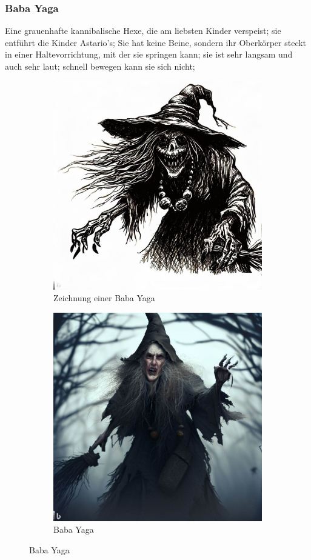 \documentclass[11pt, twoside]{article}
\begin{document}
\subsubsection{Baba Yaga\label{baba}}
\label{sec:orgacc5a1b}
Eine grauenhafte kannibalische Hexe, die am liebsten Kinder verspeist; sie entführt die Kinder Astario’s; Sie hat keine Beine, sondern ihr Oberkörper steckt in einer Haltevorrichtung, mit der sie springen kann; sie ist sehr langsam und auch sehr laut; schnell bewegen kann sie sich nicht;
\begin{figure}[H]
\centering
\caption{Baba Yaga}
\label{fig:baba}
  \begin{subfigure}{0.5\textwidth}
    \centering
    \includegraphics[width=0.8\linewidth]{baba1.jpeg}
    \caption{Zeichnung einer Baba Yaga}
  \end{subfigure}%
  \begin{subfigure}{0.5\textwidth}
    \centering
    \includegraphics[width=0.8\linewidth]{baba2.jpeg}
    \caption{Baba Yaga}
  \end{subfigure}
\end{figure}
\end{document}
